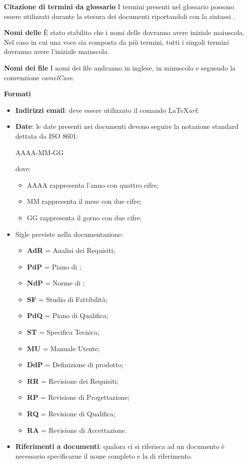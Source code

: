 \textbf{Citazione di termini da glossario}
I termini presenti nel glossario possono essere utilizzati durante la stesura dei documenti riportandoli con la sintassi .

\textbf{Nomi delle }
\`E stato stabilito che i nomi delle  dovranno avere iniziale maiuscola.		
Nel caso in cui una voce sia composta da pi\`u termini, tutti i singoli termini dovranno avere l'iniziale maiuscola.

\textbf{Nomi dei file}
I nomi dei file andranno in inglese, in minuscolo e seguendo la convenzione \textit{camelCase}.



\textbf{Formati} 
\begin{itemize}
\item \textbf{Indirizzi email}: deve essere utilizzato il comando \LaTeX \textit{url};
\item \textbf{Date}: le date presenti nei documenti devono seguire la notazione standard dettata da ISO 8601:

  \begin{center}
    AAAA-MM-GG
  \end{center}
  
  dove:
  \begin{itemize}
  \item AAAA rappresenta l'anno con quattro cifre;
  \item MM rappresenta il mese con due cifre;
  \item GG rappresenta il gorno con due cifre.
  \end{itemize}
\item Sigle previste nella documentazione:
  \begin{itemize}
  \item \textbf{AdR} = Analisi dei Requisiti;
  \item \textbf{PdP} = Piano di ;
  \item \textbf{NdP} = Norme di ;
  \item \textbf{SF} = Studio di Fattibilità;
  \item \textbf{PdQ} = Piano di Qualifica;
  \item \textbf{ST} = Specifica Tecnica;
  \item \textbf{MU} = Manuale Utente;
  \item \textbf{DdP} = Definizione di prodotto;
  \item \textbf{RR} = Revisione dei Requisiti;
  \item \textbf{RP} = Revisione di Progettazione;
  \item \textbf{RQ} = Revisione di Qualifica;
  \item \textbf{RA} = Revisione di Accettazione.
  \end{itemize}
\item \textbf{Riferimenti a documenti}: qualora ci si riferisca ad un documento è necessario specificarne il nome completo e la  di riferimento.
\end{itemize}



